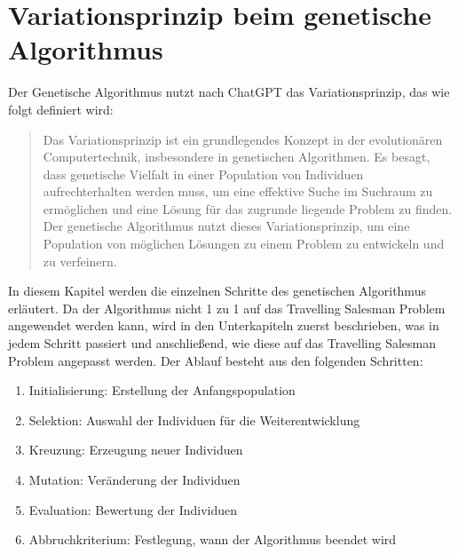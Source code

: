 %
%
%
%
\section{Variationsprinzip beim genetische Algorithmus
\label{buch:paper:varalg:section:genetic_algorithm_process}}
Der Genetische Algorithmus nutzt nach ChatGPT das Variationsprinzip, 
das wie folgt definiert wird:
\begin{quote}
Das Variationsprinzip ist ein grundlegendes Konzept in der 
evolutionären Computertechnik, insbesondere in genetischen 
Algorithmen. Es besagt, dass genetische Vielfalt in einer 
Population von Individuen aufrechterhalten werden muss, 
um eine effektive Suche im Suchraum zu ermöglichen und eine 
Lösung für das zugrunde liegende Problem zu finden.
\\
Der genetische Algorithmus nutzt dieses Variationsprinzip, um eine 
Population von möglichen Lösungen zu einem Problem zu entwickeln 
und zu verfeinern\cite{chatgpt2024}.
\end{quote}
In diesem Kapitel werden die einzelnen Schritte des genetischen Algorithmus 
erläutert. Da der Algorithmus nicht 1 zu 1 auf das Travelling Salesman
Problem angewendet werden kann, wird in den Unterkapiteln zuerst beschrieben,
was in jedem Schritt passiert und anschließend, wie diese auf das Travelling 
Salesman Problem angepasst werden. Der Ablauf besteht aus den folgenden Schritten:
\begin{enumerate}
    \item Initialisierung: Erstellung der Anfangspopulation
    \item Selektion: Auswahl der Individuen für die Weiterentwicklung
    \item Kreuzung: Erzeugung neuer Individuen
    \item Mutation: Veränderung der Individuen
    \item Evaluation: Bewertung der Individuen
    \item Abbruchkriterium: Festlegung, wann der Algorithmus beendet wird
\end{enumerate}









